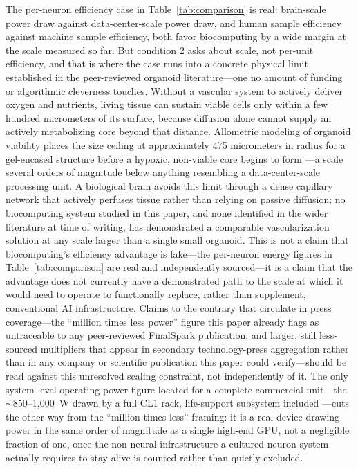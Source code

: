 \documentclass[journal]{IEEEtran}
\begin{document}
The per-neuron efficiency case in Table~\ref{tab:comparison} is real: brain-scale
power draw against data-center-scale power draw, and human sample efficiency against
machine sample efficiency, both favor biocomputing by a wide margin at the scale
measured so far. But condition 2 asks about scale, not per-unit efficiency, and that
is where the case runs into a concrete physical limit established in the
peer-reviewed organoid literature---one no amount of funding or algorithmic
cleverness touches. Without a vascular system to actively
deliver oxygen and nutrients, living tissue can sustain viable cells only within a
few hundred micrometers of its surface, because diffusion alone cannot supply an
actively metabolizing core beyond that distance. Allometric modeling of organoid
viability places the size ceiling at approximately 475 micrometers in radius for a
gel-encased structure before a hypoxic, non-viable core begins to form
\cite{magliaro2019allometric}---a scale several orders of magnitude below anything
resembling a data-center-scale processing unit. A biological brain avoids this limit
through a dense capillary network that actively perfuses tissue rather than relying
on passive diffusion; no biocomputing system studied in this paper, and none
identified in the wider literature at time of writing, has demonstrated a comparable
vascularization solution at any scale larger than a single small organoid. This is
not a claim that biocomputing's efficiency advantage is fake---the per-neuron energy
figures in Table~\ref{tab:comparison} are real and independently sourced---it is a
claim that the advantage does not currently have a demonstrated path to the scale at
which it would need to operate to functionally replace, rather than supplement,
conventional AI infrastructure. Claims to the contrary that circulate in press
coverage---the ``million times less power'' figure this paper already flags as
untraceable to any peer-reviewed FinalSpark publication, and larger, still
less-sourced multipliers that appear in secondary technology-press aggregation
rather than in any company or scientific publication this paper could
verify---should be read against this unresolved scaling constraint, not
independently of it. The only system-level operating-power figure located for a
complete commercial unit---the $\sim$850--1{,}000~W drawn by a full CL1 rack,
life-support subsystem included \cite{thompson2025cl1launch}---cuts the other way
from the ``million times less'' framing: it is a real device drawing power in the
same order of magnitude as a single high-end GPU, not a negligible fraction of one,
once the non-neural infrastructure a cultured-neuron system actually requires to
stay alive is counted rather than quietly excluded.
\end{document}
